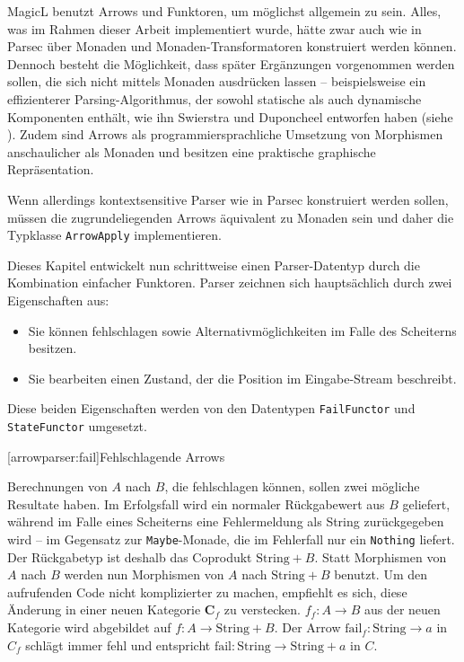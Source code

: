 \documentclass[12pt, a4paper, bibgerm]{scrbook}
\newcommand\icode[1]{\lstinline?#1?}
\newcommand\lsection{}
\begin{document}
MagicL benutzt Arrows und Funktoren, um möglichst allgemein zu
sein. Alles, was im Rahmen dieser Arbeit implementiert wurde, hätte zwar
auch wie in Parsec über Monaden und Monaden-Transformatoren konstruiert
werden können. Dennoch besteht die Möglichkeit, dass später Ergänzungen
vorgenommen werden sollen, die sich nicht mittels Monaden ausdrücken
lassen -- beispielsweise ein effizienterer Parsing-Algorithmus, der
sowohl statische als auch dynamische Komponenten enthält, wie ihn
Swierstra und Duponcheel entworfen haben (siehe
\cite[S. 8ff]{Hughes}). Zudem sind Arrows als programmiersprachliche
Umsetzung von Morphismen anschaulicher als Monaden und besitzen eine
praktische graphische Repräsentation.

Wenn allerdings kontextsensitive Parser wie in Parsec konstruiert werden
sollen, müssen die zugrundeliegenden Arrows äquivalent zu Monaden sein
und daher die Typklasse \icode{ArrowApply} implementieren.

Dieses Kapitel entwickelt nun schrittweise einen Parser-Datentyp durch
die Kombination einfacher Funktoren. Parser zeichnen sich hauptsächlich
durch zwei Eigenschaften aus:
\begin{itemize}
\item Sie können fehlschlagen sowie Alternativmöglichkeiten im Falle des
  Scheiterns besitzen.
\item Sie bearbeiten einen Zustand, der die Position im Eingabe-Stream
  beschreibt.
\end{itemize}
Diese beiden Eigenschaften werden von den Datentypen \icode{FailFunctor}
und \icode{StateFunctor} umgesetzt.

\lsection[arrowparser:fail]{Fehlschlagende Arrows}

Berechnungen von $A$ nach $B$, die fehlschlagen können, sollen zwei
mögliche Resultate haben. Im Erfolgsfall wird ein normaler Rückgabewert
aus $B$ geliefert, während im Falle eines Scheiterns eine Fehlermeldung
als String zurückgegeben wird -- im Gegensatz zur \icode{Maybe}-Monade,
die im Fehlerfall nur ein \icode{Nothing} liefert. Der Rückgabetyp ist
deshalb das Coprodukt $\mathrm{String}+B$. Statt Morphismen von $A$ nach
$B$ werden nun Morphismen von $A$ nach $\mathrm{String}+B$ benutzt. Um
den aufrufenden Code nicht komplizierter zu machen, empfiehlt es sich,
diese Änderung in einer neuen Kategorie $\mathbf{C}_f$ zu
verstecken. $f_{f} : A \rightarrow B$ aus der neuen Kategorie wird
abgebildet auf $f : A \rightarrow \mathrm{String} + B$. Der Arrow
$\mathrm{fail}_{f} : \mathrm{String} \rightarrow a$ in $C_{f}$ schlägt
immer fehl und entspricht $\mathrm{fail} : \mathrm{String} \rightarrow
\mathrm{String} + a$ in $C$.
\end{document}
